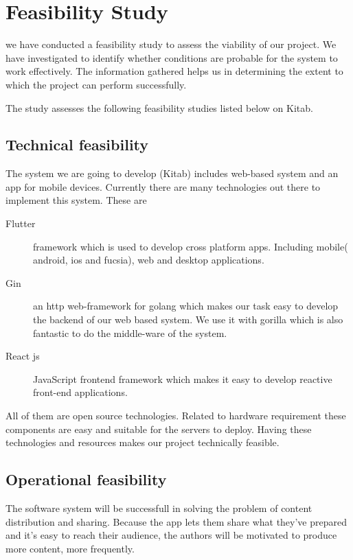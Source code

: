 \section{Feasibility Study}
we have conducted a feasibility study to assess the viability of our project. We have investigated to identify whether conditions are probable for the system to work effectively. The information gathered helps us in determining the extent to which the project can perform successfully.

\bigskip

The study assesses the following feasibility studies listed below on Kitab.

	\subsection{Technical feasibility}
The system we are going to develop (Kitab) includes web-based system and an app for mobile devices. Currently there are many technologies out there to implement this system.
These are

	\begin{description}
	\item[Flutter] framework which is used to develop cross platform apps. Including mobile( android, ios and fucsia), web and desktop applications.
	\item[Gin] an http web-framework for golang which makes our task easy to develop the backend of our web based system. We use it with gorilla which is also fantastic to do the middle-ware of the system.
	\item[React js] JavaScript frontend framework which makes it easy to develop reactive front-end applications.
	\end{description}

All of them are open source technologies. Related to hardware requirement these components are easy and suitable for the servers to deploy. Having these technologies and resources makes our project technically feasible.

	\subsection{Operational feasibility}
The software system will be successfull in solving the problem of content distribution and sharing. Because the app lets them share what they've prepared and it's easy to reach their audience, the authors will be motivated to produce more content, more frequently. 

